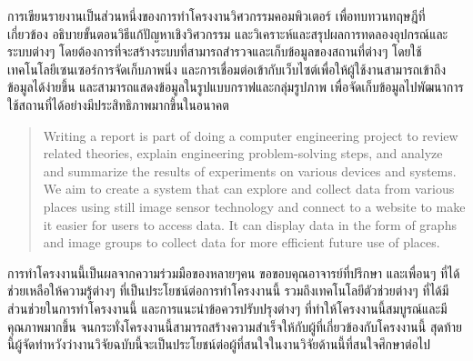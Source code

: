 \maketitle
\makesignature

\ifproject
\begin{abstractTH}
การเขียนรายงานเป็นส่วนหนึ่งของการทำโครงงานวิศวกรรมคอมพิวเตอร์
เพื่อทบทวนทฤษฎีที่เกี่ยวข้อง อธิบายขั้นตอนวิธีแก้ปัญหาเชิงวิศวกรรม และวิเคราะห์และสรุปผลการทดลองอุปกรณ์และระบบต่างๆ
\enskip โดยต้องการที่จะสร้างระบบที่สามารถสำรวจและเก็บข้อมูลของสถานที่ต่างๆ โดยใช้เทคโนโลยีเซนเซอร์การจัดเก็บภาพนิ่ง
\enskip และการเชื่อมต่อเข้ากับเว็บไซต์เพื่อให้ผู้ใช้งานสามารถเข้าถึงข้อมูลได้ง่ายขึ้น และสามารถแสดงข้อมูลในรูปแบบกราฟและกลุ่มรูปภาพ
\enskip เพื่อจัดเก็บข้อมูลไปพัฒนาการใช้สถานที่ได้อย่างมีประสิทธิภาพมากขึ้นในอนาคต
\end{abstractTH}

\begin{abstract}
Writing a report is part of doing a computer engineering project to review related theories, 
\enskip explain engineering problem-solving steps, and analyze and summarize the results of experiments on various devices and systems.
\enskip We aim to create a system that can explore and collect data from various places using still image sensor technology and connect to a website to make it easier for users to access data.
\enskip It can display data in the form of graphs and image groups to collect data for more efficient future use of places.

\end{abstract}

\iffalse
\begin{dedication}
This document is dedicated to all Chiang Mai University students.

Dedication page is optional.
\end{dedication}
\fi %

\begin{acknowledgments}
การทำโครงงานนี้เป็นผลจากความร่วมมือของหลายๆคน ขอขอบคุณอาจารย์ที่ปรึกษา และเพื่อนๆ ที่ได้ช่วยเหลือให้ความรู้ต่างๆ ที่เป็นประโยชน์ต่อการทำโครงงานนี้
\enskip รวมถึงเทคโนโลยีตัวช่วยต่างๆ ที่ได้มีส่วนช่วยในการทำโครงงานนี้
\enskip และการแนะนำข้อควรปรับปรุงต่างๆ ที่ทำให้โครงงานนี้สมบูรณ์และมีคุณภาพมากขึ้น
\enskip จนกระทั่งโครงงานนี้สามารถสร้างความสำเร็จให้กับผู้ที่เกี่ยวข้องกับโครงงานนี้
\enskip สุดท้ายนี้ผู้จัดทำหวังว่างานวิจัยฉบับนี้จะเป็นประโยชน์ต่อผู้ที่สนใจในงานวิจัยด้านนี้ที่สนใจศึกษาต่อไป 

\end{acknowledgments}%
\fi %

\contentspage

\ifproject
\figurelistpage

\tablelistpage
\fi %



